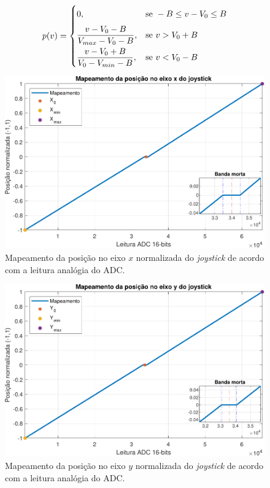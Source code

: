 \begin{equation}\label{eq:joy}
	p(v) = \begin{dcases}
		0\vphantom{\frac{0}{0}}, &\text{se } - B \le v - V_0 \le B \\
		\frac{v - V_0 - B}{V_{max} - V_0 - B}, &\text{se } v > V_0 + B \\
		\frac{v - V_0 + B}{V_0 - V_{min} - B}, &\text{se } v < V_0 - B 
	\end{dcases}
\end{equation}

\begin{figure}[H]
	\centering
	\includegraphics[width=0.75\linewidth]{img/plot_joy_x_axis.pdf}
	\caption{Mapeamento da posição no eixo $x$ normalizada do \textit{joystick} de acordo com a leitura analógia do ADC.}
	\label{fig:plotjoyxaxis}
\end{figure}


\begin{figure}[H]
\centering
\includegraphics[width=0.75\linewidth]{img/plot_joy_y_axis.pdf}
\caption{Mapeamento da posição no eixo $y$ normalizada do \textit{joystick} de acordo com a leitura analógia do ADC.}
\label{fig:plotjoyyaxis}
\end{figure}

\clearpage

